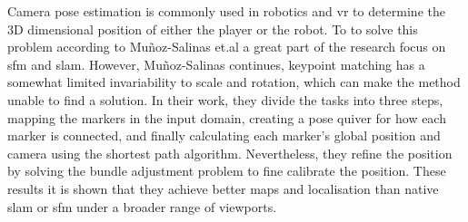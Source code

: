 Camera pose estimation is commonly used in robotics and \ac{vr} to determine the 3D dimensional position of either the player or the robot.
To to solve this problem according to Mu{\~n}oz-Salinas et.al\cite{munoz2018mapping} a great part of the research focus on \ac{sfm} and \ac{slam}.
However, Mu{\~n}oz-Salinas continues, keypoint matching has a somewhat limited invariability to scale and rotation, which can make the method unable to find a solution.
In their work, they divide the tasks into three steps, mapping the markers in the input domain, creating a pose quiver for how each marker is connected, and finally calculating each marker's global position and camera using the shortest path algorithm.
Nevertheless, they refine the position by solving the bundle adjustment problem to fine calibrate the position.
These results it is shown that they achieve better maps and localisation than native \ac{slam} or \ac{sfm} under a broader range of viewports.




